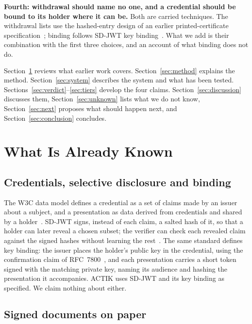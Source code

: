 \documentclass[10pt,a4paper,twocolumn]{article}
\begin{document}
\textbf{Fourth: withdrawal should name no one, and a credential should be bound
to its holder where it can be.} Both are carried techniques. The withdrawal lists
use the hashed-entry design of an earlier printed-certificate
specification~\citep{chay2026qrseal}; binding follows SD-JWT key
binding~\citep{rfc9901}. What we add is their combination with the first three
choices, and an account of what binding does not do.

Section~\ref{sec:known} reviews what earlier work covers. Section~\ref{sec:method}
explains the method. Section~\ref{sec:system} describes the system and what has
been tested. Sections~\ref{sec:verdict}--\ref{sec:tiers} develop the four claims.
Section~\ref{sec:discussion} discusses them, Section~\ref{sec:unknown} lists what
we do not know, Section~\ref{sec:next} proposes what should happen next, and
Section~\ref{sec:conclusion} concludes.

\section{What Is Already Known}
\label{sec:known}

\subsection{Credentials, selective disclosure and binding}

The W3C data model defines a credential as a set of claims made by an issuer
about a subject, and a presentation as data derived from credentials and shared
by a holder~\citep{vcdm2}. SD-JWT signs, instead of each claim, a salted hash of
it, so that a holder can later reveal a chosen subset; the verifier can check
each revealed claim against the signed hashes without learning the
rest~\citep{rfc9901}. The same standard defines key binding: the issuer places
the holder's public key in the credential, using the confirmation claim of
RFC~7800~\citep{rfc7800}, and each presentation carries a short token signed with
the matching private key, naming its audience and hashing the presentation it
accompanies. ACTIK uses SD-JWT and its key binding as specified. We claim nothing
about either.

\subsection{Signed documents on paper}
\end{document}
